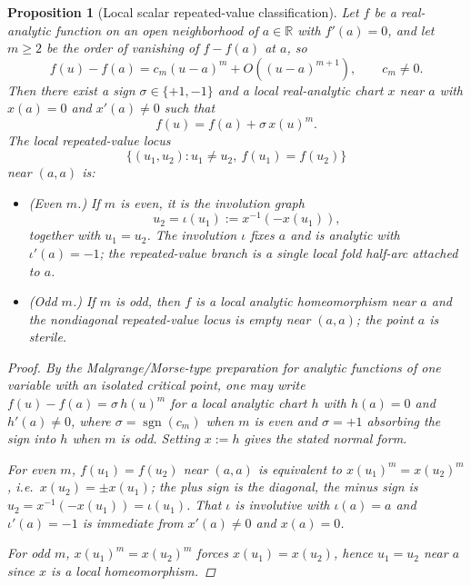 \documentclass[11pt,a4paper]{amsart}
\theoremstyle{plain}
\newtheorem{proposition}[theorem]{Proposition}
\theoremstyle{definition}
\begin{document}
\begin{proposition}[Local scalar repeated-value classification]
\label{prop:local-scalar-repeated-value-classification}
Let $f$ be a real-analytic function on an open neighborhood of
$a\in\mathbb R$ with $f'(a)=0$, and let $m\ge 2$ be the order of vanishing of
$f-f(a)$ at $a$, so
\[
f(u)-f(a)=c_m(u-a)^m+O((u-a)^{m+1}),
\qquad c_m\neq 0.
\]
Then there exist a sign $\sigma\in\{+1,-1\}$ and a local real-analytic chart
$x$ near $a$ with $x(a)=0$ and $x'(a)\neq 0$ such that
\[
f(u)=f(a)+\sigma\,x(u)^m.
\]
The local repeated-value locus
\[
\{(u_1,u_2):u_1\neq u_2,\ f(u_1)=f(u_2)\}
\]
near $(a,a)$ is:
\begin{itemize}
\item \emph{(Even $m$.)} If $m$ is even, it is the involution graph
\[
u_2=\iota(u_1):=x^{-1}(-x(u_1)),
\]
together with $u_1=u_2$. The involution $\iota$ fixes $a$ and is analytic with
$\iota'(a)=-1$; the repeated-value branch is a single local fold half-arc
attached to $a$.
\item \emph{(Odd $m$.)} If $m$ is odd, then $f$ is a local analytic
homeomorphism near $a$ and the nondiagonal repeated-value locus is empty near
$(a,a)$; the point $a$ is sterile.
\end{itemize}

\begin{proof}
By the Malgrange/Morse-type preparation for analytic functions of one variable
with an isolated critical point, one may write
$f(u)-f(a)=\sigma\,h(u)^m$ for a local analytic chart $h$ with $h(a)=0$ and
$h'(a)\neq 0$, where $\sigma=\operatorname{sgn}(c_m)$ when $m$ is even and
$\sigma=+1$ absorbing the sign into $h$ when $m$ is odd. Setting $x:=h$ gives
the stated normal form.

For even $m$, $f(u_1)=f(u_2)$ near $(a,a)$ is equivalent to
$x(u_1)^m=x(u_2)^m$, i.e.\ $x(u_2)=\pm x(u_1)$; the plus sign is the diagonal,
the minus sign is $u_2=x^{-1}(-x(u_1))=\iota(u_1)$. That $\iota$ is involutive
with $\iota(a)=a$ and $\iota'(a)=-1$ is immediate from $x'(a)\neq 0$ and
$x(a)=0$.

For odd $m$, $x(u_1)^m=x(u_2)^m$ forces $x(u_1)=x(u_2)$, hence $u_1=u_2$ near
$a$ since $x$ is a local homeomorphism.
\end{proof}
\end{proposition}
\end{document}

